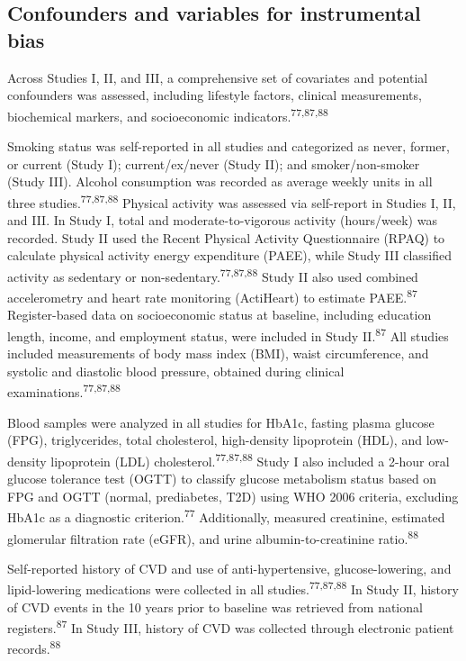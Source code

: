 \documentclass[
  a4paper,
  headsepline=true,
  open=left]{scrbook}
\begin{document}
\hypertarget{confounders-and-variables-for-instrumental-bias}{%
\subsection{Confounders and variables for instrumental
bias}\label{confounders-and-variables-for-instrumental-bias}}

Across Studies I, II, and III, a comprehensive set of covariates and
potential confounders was assessed, including lifestyle factors,
clinical measurements, biochemical markers, and socioeconomic
indicators.\textsuperscript{77,87,88}

Smoking status was self-reported in all studies and categorized as
never, former, or current (Study I); current/ex/never (Study II); and
smoker/non-smoker (Study III). Alcohol consumption was recorded as
average weekly units in all three studies.\textsuperscript{77,87,88}
Physical activity was assessed via self-report in Studies I, II, and
III. In Study I, total and moderate-to-vigorous activity (hours/week)
was recorded. Study II used the Recent Physical Activity Questionnaire
(RPAQ) to calculate physical activity energy expenditure (PAEE), while
Study III classified activity as sedentary or
non-sedentary.\textsuperscript{77,87,88} Study II also used combined
accelerometry and heart rate monitoring (ActiHeart) to estimate
PAEE.\textsuperscript{87} Register-based data on socioeconomic status at
baseline, including education length, income, and employment status,
were included in Study II.\textsuperscript{87} All studies included
measurements of body mass index (BMI), waist circumference, and systolic
and diastolic blood pressure, obtained during clinical
examinations.\textsuperscript{77,87,88}

Blood samples were analyzed in all studies for HbA1c, fasting plasma
glucose (FPG), triglycerides, total cholesterol, high-density
lipoprotein (HDL), and low-density lipoprotein (LDL)
cholesterol.\textsuperscript{77,87,88} Study I also included a 2-hour
oral glucose tolerance test (OGTT) to classify glucose metabolism status
based on FPG and OGTT (normal, prediabetes, T2D) using WHO 2006
criteria, excluding HbA1c as a diagnostic criterion.\textsuperscript{77}
Additionally, measured creatinine, estimated glomerular filtration rate
(eGFR), and urine albumin-to-creatinine ratio.\textsuperscript{88}

Self-reported history of CVD and use of anti-hypertensive,
glucose-lowering, and lipid-lowering medications were collected in all
studies.\textsuperscript{77,87,88} In Study II, history of CVD events in
the 10 years prior to baseline was retrieved from national
registers.\textsuperscript{87} In Study III, history of CVD was
collected through electronic patient records.\textsuperscript{88}
\end{document}

